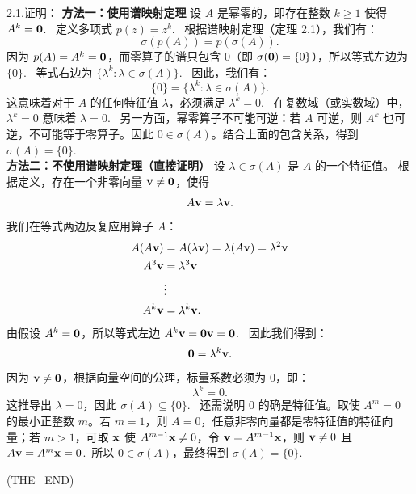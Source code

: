 \begin{exer}
2.1.证明：
\textbf{方法一：使用谱映射定理}
设 $A$ 是幂零的，即存在整数 $k \ge 1$ 使得 $A^k = \mathbf{0}$.~
定义多项式 $p(z) = z^k$.~
根据谱映射定理（定理 2.1），我们有：
$$ \sigma(p(A)) = p(\sigma(A)). $$
因为 $p(A) = A^k = \mathbf{0}$，而零算子的谱只包含 0（即 $\sigma(\mathbf{0}) = \{0\}$），所以等式左边为 $\{0\}$.~
等式右边为 $\{ \lambda^k : \lambda \in \sigma(A) \}$.~
因此，我们有：
$$ \{0\} = \{ \lambda^k : \lambda \in \sigma(A) \}. $$
这意味着对于 $A$ 的任何特征值 $\lambda$，必须满足 $\lambda^k = 0$.~
在复数域（或实数域）中，$\lambda^k = 0$ 意味着 $\lambda = 0$.~
另一方面，幂零算子不可能可逆：若 $A$ 可逆，则 $A^k$ 也可逆，不可能等于零算子。因此 $0\in\sigma(A)$。结合上面的包含关系，得到 $\sigma(A)=\{0\}$.~
\\
\textbf{方法二：不使用谱映射定理（直接证明）}
设 $\lambda \in \sigma(A)$ 是 $A$ 的一个特征值。
根据定义，存在一个非零向量 $\mathbf{v} \neq \mathbf{0}$，使得
$$ A\mathbf{v} = \lambda \mathbf{v}. $$
我们在等式两边反复应用算子 $A$：
$$
\begin{aligned}
A(A\mathbf{v}) &= A(\lambda \mathbf{v}) = \lambda (A\mathbf{v}) = \lambda^2 \mathbf{v} \\
A^3 \mathbf{v} &= \lambda^3 \mathbf{v} \\
&\vdots \\
A^k \mathbf{v} &= \lambda^k \mathbf{v}.
\end{aligned}
$$
由假设 $A^k = \mathbf{0}$，所以等式左边 $A^k \mathbf{v} = \mathbf{0} \mathbf{v} = \mathbf{0}$.~
因此我们得到：
$$ \mathbf{0} = \lambda^k \mathbf{v}. $$
因为 $\mathbf{v} \neq \mathbf{0}$，根据向量空间的公理，标量系数必须为 0，即：
$$ \lambda^k = 0. $$
这推导出 $\lambda = 0$，因此 $\sigma(A)\subseteq\{0\}$.~
还需说明 $0$ 的确是特征值。取使 $A^m=0$ 的最小正整数 $m$。若 $m=1$，则 $A=0$，任意非零向量都是零特征值的特征向量；若 $m>1$，可取 $\mathbf{x}$ 使 $A^{m-1}\mathbf{x}\neq0$，令 $\mathbf{v}=A^{m-1}\mathbf{x}$，则 $\mathbf{v}\neq0$ 且 $A\mathbf{v}=A^m\mathbf{x}=0$.~所以 $0\in\sigma(A)$，最终得到 $\sigma(A)=\{0\}$.~



\end{exer}

(THE ~END)








